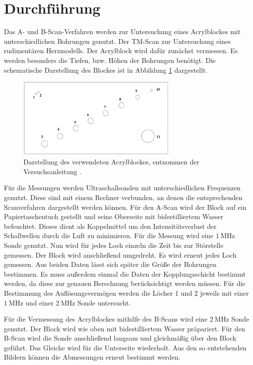 \section{Durchführung}
\label{sec:Durchführung}

Das A- und B-Scan-Verfahren werden zur Untersuchung eines Acrylblockes mit unterschiedlichen Bohrungen genutzt.
Der TM-Scan zur Untersuchung eines rudimentären Herzmodells.
Der Acrylblock wird dafür zunächst vermessen.
Es werden besonders die Tiefen, bzw. Höhen der Bohrungen benötigt.
Die schematische Darstellung des Blockes ist in Abbildung \ref{fig:kenblock} dargestellt.

\begin{figure}
  \centering
  \includegraphics[width=0.7\textwidth]{images/kenblock.png}
  \caption{Darstellung des verwendeten Acrylblockes, entnommen der Versuchsanleitung \cite[5]{sample}.}
  \label{fig:kenblock}
\end{figure}

Für die Messungen werden Ultraschallsonden mit unterschiedlichen Frequenzen genutzt.
Diese sind mit einem Rechner verbunden, an denen die entsprechenden Scanverfahren dargestellt werden können.
Für den A-Scan wird der Block auf ein Papiertaschentuch gestellt und seine Oberseite mit bidestilliertem Wasser befeuchtet.
Dieses dient als Koppelmittel um den Intensitätsverlust der Schallwellen durch die Luft zu minimieren.
Für die Messung wird eine $\SI{1}{\mega\hertz}$ Sonde genutzt.
Nun wird für jedes Loch einzeln die Zeit bis zur Störstelle gemessen.
Der Block wird anschließend umgedreht.
Es wird erneut jedes Loch gemessen.
Aus beiden Daten lässt sich später die Größe der Bohrungen bestimmen.
Es muss außerdem einmal die Daten der Kopplungsschicht bestimmt werden, da diese zur genauen Berechnung berücksichtigt werden müssen.
Für die Bestimmung des Auflösungsvermögen werden die Löcher 1 und 2 jeweils mit einer $\SI{1}{\mega\hertz}$ und einer $\SI{2}{\mega\hertz}$ Sonde untersucht.

Für die Vermessung des Acrylblockes mithilfe des B-Scans wird eine $\SI{2}{\mega\hertz}$ Sonde genutzt.
Der Block wird wie oben mit bidestilliertem Wasser präpariert.
Für den B-Scan wird die Sonde anschließend langsam und gleichmäßig über den Block geführt.
Das Gleiche wird für die Unterseite wiederholt.
Aus den so entstehenden Bildern können die Abmessungen erneut bestimmt werden.

